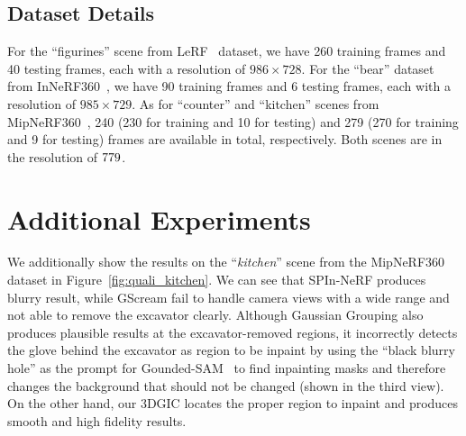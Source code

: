 \subsection{Dataset Details}
For the ``figurines'' scene from LeRF~\cite{kerr2023lerf} dataset, we have 260 training frames and 40 testing frames, each with a resolution of $986 \times 728$. For the ``bear'' dataset from InNeRF360~\cite{wang2024innerf360}, we have 90 training frames and 6 testing frames, each with a resolution of $985\times729$. As for ``counter'' and ``kitchen'' scenes from MipNeRF360~\cite{barron2022mipnerf360}, 240 (230 for training and 10 for testing) and 279 (270 for training and 9 for testing) frames are available in total, respectively. Both scenes are in the resolution of $779\time520$.

\section{Additional Experiments}
We additionally show the results on the ``\textit{kitchen}'' scene from the MipNeRF360~\cite{barron2022mipnerf360} dataset in Figure~\ref{fig:quali_kitchen}. We can see that SPIn-NeRF produces blurry result, while GScream fail to handle camera views with a wide range and not able to remove the excavator clearly. Although Gaussian Grouping also produces plausible results at the excavator-removed regions, it incorrectly detects the glove behind the excavator as region to be inpaint by using the ``black blurry hole'' as the prompt for Gounded-SAM~\cite{ren2024grounded} to find inpainting masks and therefore changes the background that should not be changed (shown in the third view). On the other hand, our 3DGIC locates the proper region to inpaint and produces smooth and high fidelity results. 


